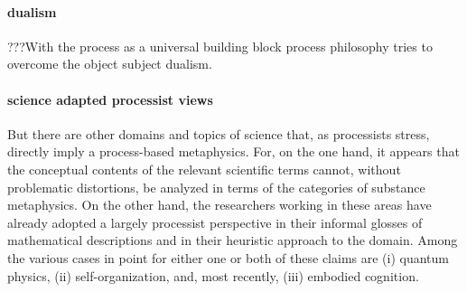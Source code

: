 \paragraph{dualism}
???With the process as a universal building block process 
philosophy tries to overcome the object subject dualism.

\paragraph{science adapted processist views}
But there are other domains and topics of science that, as processists stress, directly imply a process-based metaphysics. For, on the one hand, it appears that the conceptual contents of the relevant scientific terms cannot, without problematic distortions, be analyzed in terms of the categories of substance metaphysics. On the other hand, the researchers working in these areas have already adopted a largely processist perspective in their informal glosses of mathematical descriptions and in their heuristic approach to the domain. Among the various cases in point for either one or both of these claims are (i) quantum physics, (ii) self-organization, and, most recently, (iii) embodied cognition.

